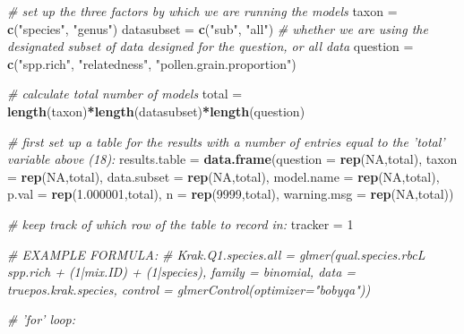 \documentclass[
]{article}
\newenvironment{Shaded}{\begin{snugshade}}{\end{snugshade}}
\newcommand{\CommentTok}[1]{\textcolor[rgb]{0.56,0.35,0.01}{\textit{#1}}}
\newcommand{\DataTypeTok}[1]{\textcolor[rgb]{0.13,0.29,0.53}{#1}}
\newcommand{\DecValTok}[1]{\textcolor[rgb]{0.00,0.00,0.81}{#1}}
\newcommand{\FloatTok}[1]{\textcolor[rgb]{0.00,0.00,0.81}{#1}}
\newcommand{\KeywordTok}[1]{\textcolor[rgb]{0.13,0.29,0.53}{\textbf{#1}}}
\newcommand{\NormalTok}[1]{#1}
\newcommand{\OperatorTok}[1]{\textcolor[rgb]{0.81,0.36,0.00}{\textbf{#1}}}
\newcommand{\OtherTok}[1]{\textcolor[rgb]{0.56,0.35,0.01}{#1}}
\newcommand{\StringTok}[1]{\textcolor[rgb]{0.31,0.60,0.02}{#1}}
\begin{document}
\begin{Shaded}
\begin{Highlighting}[]
\CommentTok{# set up the three factors by which we are running the models}
\NormalTok{taxon =}\StringTok{ }\KeywordTok{c}\NormalTok{(}\StringTok{"species"}\NormalTok{, }\StringTok{"genus"}\NormalTok{)}
\NormalTok{datasubset =}\StringTok{ }\KeywordTok{c}\NormalTok{(}\StringTok{"sub"}\NormalTok{, }\StringTok{"all"}\NormalTok{) }\CommentTok{# whether we are using the designated subset of data designed for the question, or all data}
\NormalTok{question =}\StringTok{ }\KeywordTok{c}\NormalTok{(}\StringTok{"spp.rich"}\NormalTok{, }\StringTok{"relatedness"}\NormalTok{, }\StringTok{"pollen.grain.proportion"}\NormalTok{)}

\CommentTok{# calculate total number of models}
\NormalTok{total =}\StringTok{ }\KeywordTok{length}\NormalTok{(taxon)}\OperatorTok{*}\KeywordTok{length}\NormalTok{(datasubset)}\OperatorTok{*}\KeywordTok{length}\NormalTok{(question)}

\CommentTok{# first set up a table for the results with a number of entries equal to the 'total' variable above (18):}
\NormalTok{results.table =}\StringTok{ }\KeywordTok{data.frame}\NormalTok{(}\DataTypeTok{question =} \KeywordTok{rep}\NormalTok{(}\OtherTok{NA}\NormalTok{,total), }\DataTypeTok{taxon  =} \KeywordTok{rep}\NormalTok{(}\OtherTok{NA}\NormalTok{,total), }\DataTypeTok{data.subset  =} \KeywordTok{rep}\NormalTok{(}\OtherTok{NA}\NormalTok{,total), }\DataTypeTok{model.name =} \KeywordTok{rep}\NormalTok{(}\OtherTok{NA}\NormalTok{,total), }\DataTypeTok{p.val  =} \KeywordTok{rep}\NormalTok{(}\FloatTok{1.000001}\NormalTok{,total), }\DataTypeTok{n  =} \KeywordTok{rep}\NormalTok{(}\DecValTok{9999}\NormalTok{,total), }\DataTypeTok{warning.msg =} \KeywordTok{rep}\NormalTok{(}\OtherTok{NA}\NormalTok{,total))}

\CommentTok{# keep track of which row of the table to record in:}
\NormalTok{tracker =}\StringTok{ }\DecValTok{1}

\CommentTok{# EXAMPLE FORMULA:}
\CommentTok{# Krak.Q1.species.all = glmer(qual.species.rbcL ~ spp.rich + (1|mix.ID) + (1|species), family = binomial, data = truepos.krak.species, control = glmerControl(optimizer="bobyqa"))}

\CommentTok{# 'for' loop:}


\end{Highlighting}
\end{Shaded}
\end{document}
